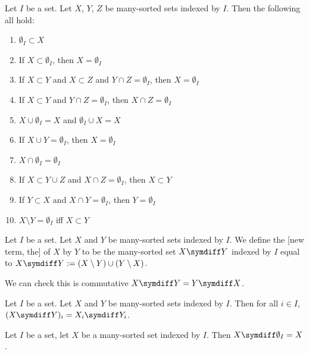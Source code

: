 \begin{theorem}
Let $I$ be a set.
Let $X$, $Y$, $Z$ be many-sorted sets indexed by $I$. Then the
following all hold:
\begin{enumerate}
\item{} $\emptyset_{I}\subset X$
\item{} If $X\subset\emptyset_{I}$, then $X=\emptyset_{I}$
\item{} If $X\subset Y$ and $X\subset Z$ and $Y\cap Z=\emptyset_{I}$,
then $X=\emptyset_{I}$
\item{} If $X\subset Y$ and $Y\cap Z=\emptyset_{I}$,
  then $X\cap Z=\emptyset_{I}$
\item{} $X\cup\emptyset_{I}=X$ and $\emptyset_{I}\cup X=X$
\item{} If $X\cup Y=\emptyset_{I}$, then $X=\emptyset_{I}$
\item{} $X\cap\emptyset_{I}=\emptyset_{I}$
\item{} If $X\subset Y\cup Z$ and $X\cap Z=\emptyset_{I}$,
  then $X\subset Y$
\item{} If $Y\subset X$ and $X\cap Y=\emptyset_{I}$, then $Y=\emptyset_{I}$
\item{} $X\setminus Y=\emptyset_{I}$ iff $X\subset Y$
\end{enumerate}
\end{theorem}

\begin{definition}
Let $I$ be a set.
Let $X$ and $Y$ be many-sorted sets indexed by $I$.
We define the [new term, the]  of $X$ by
$Y$ to be the many-sorted set $X\symdiff Y$ indexed by $I$ equal to
$X\symdiff Y:=(X\setminus Y)\cup(Y\setminus X)$.

We can check this is commutative $X\symdiff Y=Y\symdiff X$.
\end{definition}

\begin{theorem}
Let $I$ be a set.
Let $X$ and $Y$ be many-sorted sets indexed by $I$.
Then 
for all $i\in I$, $(X\symdiff Y)_{i}=X_{i}\symdiff Y_{i}$.
\end{theorem}

\begin{theorem}
Let $I$ be a set, let $X$ be a many-sorted set indexed by $I$.
Then $X\symdiff\emptyset_{I}=X$.
\end{theorem}


